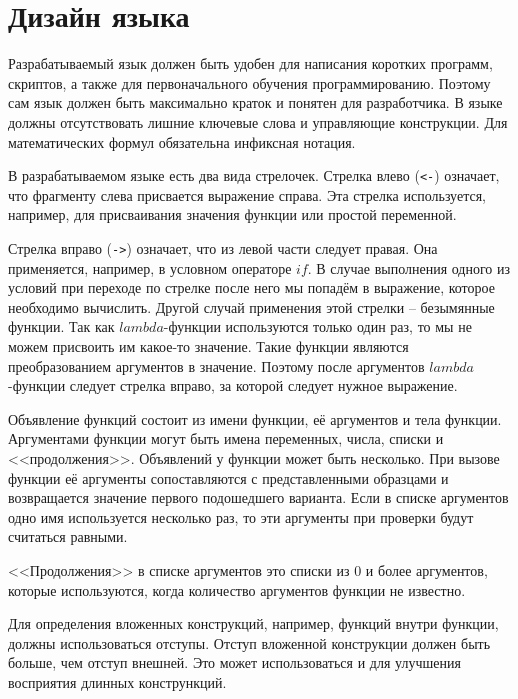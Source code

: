 \section{Дизайн языка}
    Разрабатываемый язык должен быть удобен для написания коротких программ, скриптов, а также для первоначального обучения программированию.
    Поэтому сам язык должен быть максимально краток и понятен для разработчика.
    В языке должны отсутствовать лишние ключевые слова и управляющие конструкции.
    Для математических формул обязательна инфиксная нотация.

    В разрабатываемом языке есть два вида стрелочек.
    Стрелка влево (\verb!<-!) означает, что фрагменту слева присвается выражение справа.
    Эта стрелка используется, например, для присваивания значения функции или простой переменной.

    Стрелка вправо (\verb!->!) означает, что из левой части следует правая.
    Она применяется, например, в условном операторе $if$.
    В случае выполнения одного из условий при переходе по стрелке после него мы попадём в выражение, которое необходимо вычислить.
    Другой случай применения этой стрелки -- безымянные функции.
    Так как $lambda$-функции используются только один раз, то мы не можем присвоить им какое-то значение.
    Такие функции являются преобразованием аргументов в значение.
    Поэтому после аргументов $lambda$-функции следует стрелка вправо, за которой следует нужное выражение.

    Объявление функций состоит из имени функции, её аргументов и тела функции.
    Аргументами функции могут быть имена переменных, числа, списки и <<продолжения>>.
    Объявлений у функции может быть несколько.
    При вызове функции её аргументы сопоставляются с представленными образцами и возвращается значение первого подошедшего варианта.
    Если в списке аргументов одно имя используется несколько раз, то эти аргументы при проверки будут считаться равными.

    <<Продолжения>> в списке аргументов это списки из 0 и более аргументов, которые используются, когда количество аргументов функции не известно.

    Для определения вложенных конструкций, например, функций внутри функции, должны использоваться отступы.
    Отступ вложенной конструкции должен быть больше, чем отступ внешней.
    Это может использоваться и для улучшения восприятия длинных констрункций.

